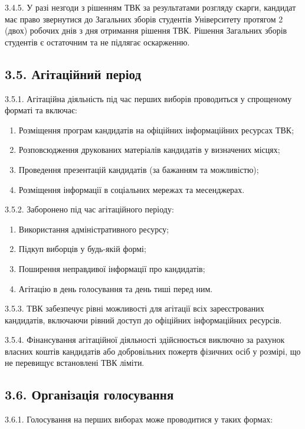     3.4.5. У разі незгоди з рішенням ТВК за результатами розгляду скарги, кандидат має право звернутися до Загальних зборів студентів Університету протягом 2 (двох) робочих днів з дня отримання рішення ТВК. Рішення Загальних зборів студентів є остаточним та не підлягає оскарженню.

\subsection*{3.5. Агітаційний період}
    3.5.1. Агітаційна діяльність під час перших виборів проводиться у спрощеному форматі та включає:

        \begin{enumerate}[label=\alph*)]
            \item Розміщення програм кандидатів на офіційних інформаційних ресурсах ТВК;
            \item Розповсюдження друкованих матеріалів кандидатів у визначених місцях;
            \item Проведення презентацій кандидатів (за бажанням та можливістю);
            \item Розміщення інформації в соціальних мережах та месенджерах.
        \end{enumerate}

    3.5.2. Заборонено під час агітаційного періоду:

        \begin{enumerate}[label=\alph*)]
            \item Використання адміністративного ресурсу;
            \item Підкуп виборців у будь-якій формі;
            \item Поширення неправдивої інформації про кандидатів;
            \item Агітацію в день голосування та день тиші перед ним.
        \end{enumerate}

    3.5.3. ТВК забезпечує рівні можливості для агітації всіх зареєстрованих кандидатів, включаючи рівний доступ до офіційних інформаційних ресурсів.

    3.5.4. Фінансування агітаційної діяльності здійснюється виключно за рахунок власних коштів кандидатів або добровільних пожертв фізичних осіб у розмірі, що не перевищує встановлені ТВК ліміти.

\subsection*{3.6. Організація голосування}
    3.6.1. Голосування на перших виборах може проводитися у таких формах:

